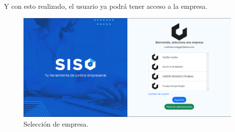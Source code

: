 Y con esto realizado, el usuario ya podrá tener acceso a la empresa.
    \begin{figure}[H]
        \begin{center}
            \includegraphics[scale=0.4]{img/actividades/integracion/ingreso-empresa.png}
            \caption{Selección de empresa.}
            \label{fig:ingreso-empresa}
        \end{center}
    \end{figure}